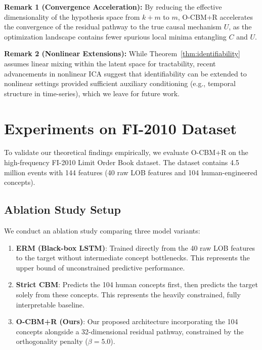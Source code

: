 \documentclass[twoside,11pt]{article}
\begin{document}
\textbf{Remark 1 (Convergence Acceleration):} By reducing the effective dimensionality of the hypothesis space from $k+m$ to $m$, O-CBM+R accelerates the convergence of the residual pathway to the true causal mechanism $U$, as the optimization landscape contains fewer spurious local minima entangling $C$ and $U$.

\textbf{Remark 2 (Nonlinear Extensions):} While Theorem~\ref{thm:identifiability} assumes linear mixing within the latent space for tractability, recent advancements in nonlinear ICA \citep{Hyvarinen2019, Locatello2019} suggest that identifiability can be extended to nonlinear settings provided sufficient auxiliary conditioning (e.g., temporal structure in time-series), which we leave for future work.

\section{Experiments on FI-2010 Dataset}

To validate our theoretical findings empirically, we evaluate O-CBM+R on the high-frequency FI-2010 Limit Order Book dataset. The dataset contains 4.5 million events with 144 features (40 raw LOB features and 104 human-engineered concepts).

\subsection{Ablation Study Setup}
We conduct an ablation study comparing three model variants:
\begin{enumerate}
    \item \textbf{ERM (Black-box LSTM)}: Trained directly from the 40 raw LOB features to the target without intermediate concept bottlenecks. This represents the upper bound of unconstrained predictive performance.
    \item \textbf{Strict CBM}: Predicts the 104 human concepts first, then predicts the target solely from these concepts. This represents the heavily constrained, fully interpretable baseline.
    \item \textbf{O-CBM+R (Ours)}: Our proposed architecture incorporating the 104 concepts alongside a 32-dimensional residual pathway, constrained by the orthogonality penalty ($\beta = 5.0$).
\end{enumerate}
\end{document}

